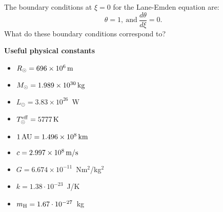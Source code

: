 \documentclass[12pt]{article}
\begin{document}
The boundary conditions at $\xi=0$ for the Lane-Emden equation are:
\begin{equation}
\theta = 1,\ \mbox{and}\ \frac{d\theta}{d\xi} = 0.
\end{equation}
What do these boundary conditions correspond to?

{\bf Useful physical constants}
\begin{itemize}
  \item $R_{\odot} = 696 \times 10^6\,{\rm m}$
  \item $M_{\odot} = 1.989 \times 10^{30}\,{\rm kg}$
  \item $L_{\odot} = 3.83 \times 10^{26}$~W
  \item $T^{\rm eff}_{\odot} = 5777\,{\rm K}$
  \item $1\,{\rm AU} = 1.496 \times 10^8\,{\rm km}$
  \item $c = 2.997 \times 10^8\,{\rm m/s}$
  \item $G = 6.674 \times 10^{-11}$~Nm$^2$/kg$^2$
  \item $k = 1.38\cdot10^{-23}$~J/K
  \item $m_{\rm H} = 1.67\cdot10^{-27}$~kg
\end{itemize}
\end{document}
